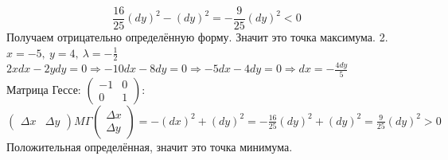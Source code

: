 \documentclass[12pt, letterpaper, twoside]{article}
\begin{document}
    \[\frac{16}{25} (dy)^2 - (dy)^2 = -\frac{9}{25} (dy)^2 < 0 \]
    Получаем отрицательно определённую форму. Значит это точка максимума.
    2. $x =-5,\ y = 4,\ \lambda = -\frac{1}{2}$\\
    $2xdx - 2ydy = 0\Rightarrow -10 dx - 8 dy = 0\Rightarrow -5dx - 4dy = 0\Rightarrow dx = -\frac{4 dy}{5}$\\
    Матрица Гессе: $\begin{pmatrix}
        -1 & 0\\
        0 & 1
    \end{pmatrix}$:\\
    $\begin{pmatrix}
        \Delta x & \Delta y
    \end{pmatrix} M\Gamma \begin{pmatrix}
        \Delta x\\
        \Delta y
    \end{pmatrix} = -(dx)^2 + (dy)^2 = -\frac{16}{25}(dy)^2 + (dy)^2 = \frac{9}{25}(dy)^2 > 0$\\
    Положительная определённая, значит это точка минимума.
\end{document}

